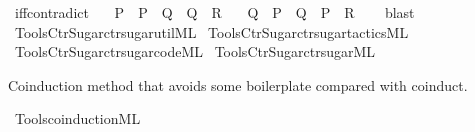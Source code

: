 \begin{isabellebody}
\endisatagproof
{\isafoldproof}%
%
\isadelimproof
\isanewline
%
\endisadelimproof
\isanewline
{}\isamarkupfalse%
\ iff{\isacharunderscore}{\kern0pt}contradict{\isacharcolon}{\kern0pt}\isanewline
\ \ {\isachardoublequoteopen}{\isasymnot}\ P\ {\isasymLongrightarrow}\ P\ {\isasymlongleftrightarrow}\ Q\ {\isasymLongrightarrow}\ Q\ {\isasymLongrightarrow}\ R{\isachardoublequoteclose}\isanewline
\ \ {\isachardoublequoteopen}{\isasymnot}\ Q\ {\isasymLongrightarrow}\ P\ {\isasymlongleftrightarrow}\ Q\ {\isasymLongrightarrow}\ P\ {\isasymLongrightarrow}\ R{\isachardoublequoteclose}\isanewline
%
\isadelimproof
\ \ %
\endisadelimproof
%
\isatagproof
{}\isamarkupfalse%
\ blast{\isacharplus}{\kern0pt}%
\endisatagproof
{\isafoldproof}%
%
\isadelimproof
\isanewline
%
\endisadelimproof
%
\isadelimML
\isanewline
%
\endisadelimML
%
\isatagML
{}\isamarkupfalse%
\ {\isacartoucheopen}Tools{\isacharslash}{\kern0pt}Ctr{\isacharunderscore}{\kern0pt}Sugar{\isacharslash}{\kern0pt}ctr{\isacharunderscore}{\kern0pt}sugar{\isacharunderscore}{\kern0pt}util{\isachardot}{\kern0pt}ML{\isacartoucheclose}\isanewline
{}\isamarkupfalse%
\ {\isacartoucheopen}Tools{\isacharslash}{\kern0pt}Ctr{\isacharunderscore}{\kern0pt}Sugar{\isacharslash}{\kern0pt}ctr{\isacharunderscore}{\kern0pt}sugar{\isacharunderscore}{\kern0pt}tactics{\isachardot}{\kern0pt}ML{\isacartoucheclose}\isanewline
{}\isamarkupfalse%
\ {\isacartoucheopen}Tools{\isacharslash}{\kern0pt}Ctr{\isacharunderscore}{\kern0pt}Sugar{\isacharslash}{\kern0pt}ctr{\isacharunderscore}{\kern0pt}sugar{\isacharunderscore}{\kern0pt}code{\isachardot}{\kern0pt}ML{\isacartoucheclose}\isanewline
{}\isamarkupfalse%
\ {\isacartoucheopen}Tools{\isacharslash}{\kern0pt}Ctr{\isacharunderscore}{\kern0pt}Sugar{\isacharslash}{\kern0pt}ctr{\isacharunderscore}{\kern0pt}sugar{\isachardot}{\kern0pt}ML{\isacartoucheclose}%
\endisatagML
{\isafoldML}%
%
\isadelimML
%
\endisadelimML
%
\begin{isamarkuptext}%
Coinduction method that avoids some boilerplate compared with coinduct.%
\end{isamarkuptext}\isamarkuptrue%
%
\isadelimML
%
\endisadelimML
%
\isatagML
{}\isamarkupfalse%
\ {\isacartoucheopen}Tools{\isacharslash}{\kern0pt}coinduction{\isachardot}{\kern0pt}ML{\isacartoucheclose}%
\endisatagML
{\isafoldML}%
%
\isadelimML
%
\endisadelimML
\isanewline
%
\isadelimtheory
\isanewline
%
\endisadelimtheory
%
\isatagtheory
{}\isamarkupfalse%
%
\endisatagtheory
{\isafoldtheory}%
%
\isadelimtheory
%
\endisadelimtheory
%
\end{isabellebody}%
